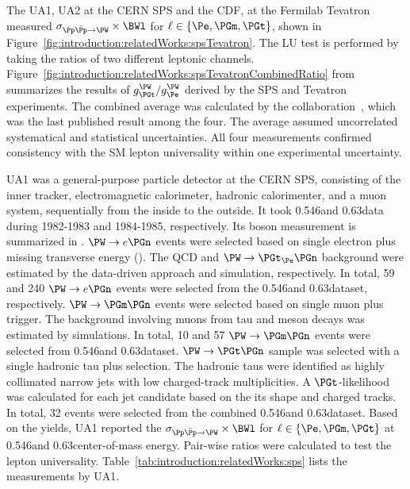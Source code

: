 The UA1, UA2 at the CERN SPS and the CDF, \DZERO at the Fermilab Tevatron measured $\sigma_{\Pp\bar{\Pp}\to \PW} \times \BWl$ for $\ell \in \{ \Pe, \PGm, \PGt\}$, shown in Figure~\ref{fig:introduction:relatedWorks:spsTevatron}. The LU test is performed by taking the ratios of two different leptonic channels. Figure~\ref{fig:introduction:relatedWorks:spsTevatronCombinedRatio} from \cite{Abbott:1999pk} summarizes the results of $g^\PW_\PGt / g^\PW_\Pe$ derived by the SPS and Tevatron experiments. The combined average was calculated by the \DZERO collaboration~\cite{Abbott:1999pk}, which was the last published result among the four. The average assumed uncorrelated systematical and statistical uncertainties. All four measurements confirmed consistency with the SM lepton universality within one experimental uncertainty.





UA1 was a general-purpose particle detector at the CERN SPS, consisting of the inner tracker, electromagnetic calorimeter, hadronic calorimenter, and a muon system, sequentially from the inside to the outside.  It took 0.546\TeV and 0.63\TeV data during 1982-1983 and 1984-1985, respectively.  Its \PW boson measurement is summarized in \cite{Albajar:1988ka}.  $\PW \to e \PGn$ events were selected based on single electron plus missing transverse energy (\MET). The QCD and $\PW\to \PGt_\Pe \PGn$ background were estimated by the data-driven approach and simulation, respectively. In total, 59 and 240 $\PW \to e \PGn$ events were selected from the 0.546\TeV and 0.63\TeV dataset, respectively.  $\PW \to \PGm \PGn$ events were selected based on single muon plus \MET trigger. The background involving muons from tau and meson decays was estimated by simulations. In total, 10 and 57 $\PW\to \PGm\PGn$ events were selected from 0.546\TeV and 0.63\TeV dataset.  $\PW\to \PGt \PGn$ sample was selected with a single hadronic tau plus \MET selection. The hadronic taus were identified as highly collimated narrow jets with low charged-track multiplicities.  A $\PGt$-likelihood was calculated for each jet candidate based on the its shape and charged tracks. In total, 32 events were selected from the combined 0.546\TeV and 0.63\TeV dataset. Based on the yields, UA1 reported the $\sigma_{\Pp\bar{\Pp}\to \PW} \times \BWl$ for $\ell \in \{ \Pe, \PGm, \PGt\}$ at 0.546\TeV and 0.63\TeV center-of-mass energy. Pair-wise ratios were calculated to test the lepton universality. Table~\ref{tab:introduction:relatedWorks:sps} lists the measurements by UA1.



